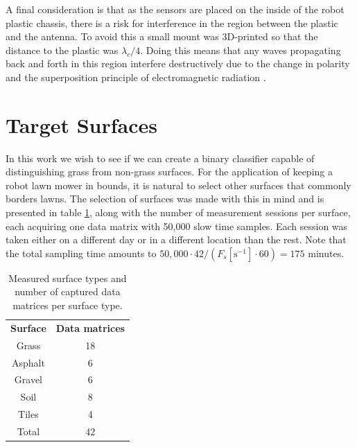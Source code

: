 A final consideration is that as the sensors are placed on the inside of the robot plastic chassis, there is a risk for interference in the region between the plastic and the antenna. To avoid this a small mount was 3D-printed so that the distance to the plastic was $\lambda_c/4$. Doing this means that any waves propagating back and forth in this region interfere destructively due to the change in polarity and the superposition principle of electromagnetic radiation \citep{griffiths_2018}.

\section{Target Surfaces}

In this work we wish to see if we can create a binary classifier capable of distinguishing grass from non-grass surfaces. For the application of keeping a robot lawn mower in bounds, it is natural to select other surfaces that commonly borders lawns. The selection of surfaces was made with this in mind and is presented in table \ref{tab:count}, along with the number of measurement sessions per surface, each acquiring one data matrix with 50,000 slow time samples. Each session was taken either on a different day or in a different location than the rest. Note that the total sampling time amounts to $50,000\cdot42/(F_s [\text{s}^{-1}]\cdot60)=175$ minutes.

\begin{table}
	\begin{center}
		\begin{tabular}{|c|c|}
			\hline
			\rowcolor{gray!150}\color{white}\textbf{Surface} & \color{white}\textbf{Data matrices} \\
			Grass & 18 \\
			\rowcolor{gray!25} Asphalt & 6 \\
			Gravel & 6 \\
			\rowcolor{gray!25} Soil & 8 \\
			Tiles & 4 \\ \hline
			\rowcolor{gray!25} Total & 42 \\
			\hline
		\end{tabular}
	\end{center}
	\caption{Measured surface types and number of captured data matrices per surface type.}
	\label{tab:count}
\end{table}

